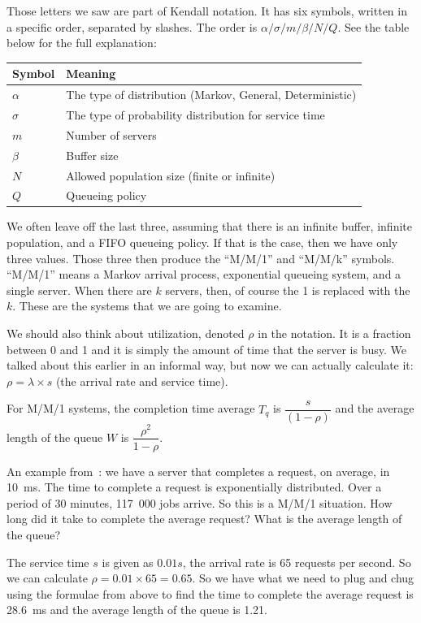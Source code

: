 Those letters we saw are part of Kendall notation. It has six symbols, written in a specific order, separated by slashes. The order is $\alpha / \sigma / m / \beta / N / Q$. See the table below for the full explanation:

\begin{center}
\begin{tabular}{l|l} 
	\textbf{Symbol} & \textbf{Meaning} \\ \hline
	$\alpha$ & The type of distribution (Markov, General, Deterministic) \\ \hline
	$\sigma$ & The type of probability distribution for service time \\ \hline
	$m$ & Number of servers \\ \hline
	$\beta$ & Buffer size \\ \hline
	$N$ & Allowed population size (finite or infinite) \\ \hline
	$Q$ & Queueing policy \\ 
\end{tabular}
\end{center}

We often leave off the last three, assuming that there is an infinite buffer, infinite population, and a FIFO queueing policy. If that is the case, then we have only three values. Those three then produce the ``M/M/1'' and ``M/M/k'' symbols. ``M/M/1'' means a Markov arrival process, exponential queueing system, and a single server. When there are $k$ servers, then, of course the 1 is replaced with the $k$. These are the systems that we are going to examine.

We should also think about utilization, denoted $\rho$ in the notation. It is a fraction between 0 and 1 and it is simply the amount of time that the server is busy. We talked about this earlier in an informal way, but now we can actually calculate it: $\rho = \lambda \times s$ (the arrival rate and service time). 

For M/M/1 systems, the completion time average $T_{q}$ is $\dfrac{s}{(1-\rho)}$ and the average length of the queue $W$ is $\dfrac{\rho^{2}}{1-\rho}$.

An example from~\cite{williams-q}: we have a server that completes a request, on average, in 10~ms. The time to complete a request is exponentially distributed. Over a period of 30 minutes, 117~000 jobs arrive. So this is a M/M/1 situation. How long did it take to complete the average request? What is the average length of the queue?

The service time $s$ is given as $0.01s$, the arrival rate is 65 requests per second. So we can calculate $\rho = 0.01 \times 65 = 0.65$. So we have what we need to plug and chug using the formulae from above to find the time to complete the average request is 28.6~ms and the average length of the queue is 1.21.

